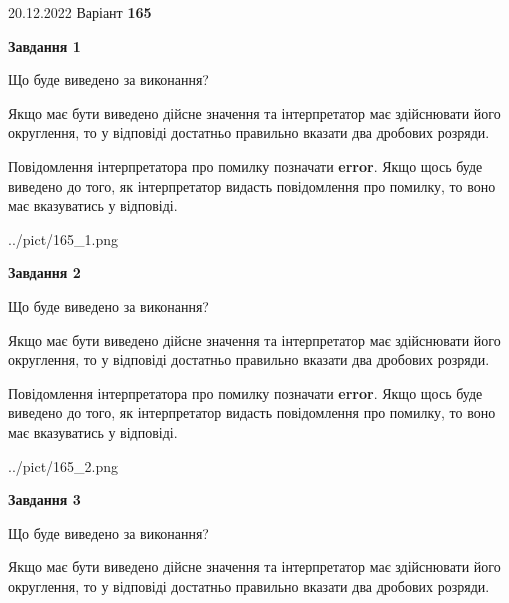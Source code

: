\documentclass[12pt, ukrainian]{article}
\begin{document}
{20.12.2022 Варіант \No \textbf { 165 }\par}
{
\begin {Large}

{\begin {center}\textbf{Завдання 1}\end {center}}\par
Що буде виведено за виконання? \par

Якщо має бути виведено дійсне значення та інтерпретатор має здійснювати його округлення, 
то у відповіді достатньо правильно вказати два дробових розряди.

Повідомлення інтерпретатора про помилку позначати \textbf{error}.
Якщо щось буде виведено до того, як інтерпретатор видасть повідомлення про помилку, 
то воно має вказуватись у відповіді. \par

\begin{center}
	{../pict/165_1.png}
\end{center}
\newpage

{\begin {center}\textbf{Завдання 2}\end {center}}\par
Що буде виведено за виконання? \par

Якщо має бути виведено дійсне значення та інтерпретатор має здійснювати його округлення, 
то у відповіді достатньо правильно вказати два дробових розряди.

Повідомлення інтерпретатора про помилку позначати \textbf{error}.
Якщо щось буде виведено до того, як інтерпретатор видасть повідомлення про помилку, 
то воно має вказуватись у відповіді. \par

\begin{center}
	{../pict/165_2.png}
\end{center}
\newpage

{\begin {center}\textbf{Завдання 3}\end {center}}\par
Що буде виведено за виконання? \par

Якщо має бути виведено дійсне значення та інтерпретатор має здійснювати його округлення, 
то у відповіді достатньо правильно вказати два дробових розряди.


\end{Large}}
\end{document}
